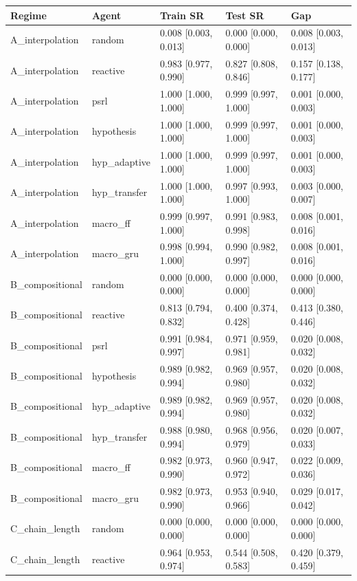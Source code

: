\begin{tabular}{lllll}
\toprule
Regime & Agent & Train SR & Test SR & Gap \\
\midrule
A\_interpolation & random & 0.008 [0.003, 0.013] & 0.000 [0.000, 0.000] & 0.008 [0.003, 0.013] \\
A\_interpolation & reactive & 0.983 [0.977, 0.990] & 0.827 [0.808, 0.846] & 0.157 [0.138, 0.177] \\
A\_interpolation & psrl & 1.000 [1.000, 1.000] & 0.999 [0.997, 1.000] & 0.001 [0.000, 0.003] \\
A\_interpolation & hypothesis & 1.000 [1.000, 1.000] & 0.999 [0.997, 1.000] & 0.001 [0.000, 0.003] \\
A\_interpolation & hyp\_adaptive & 1.000 [1.000, 1.000] & 0.999 [0.997, 1.000] & 0.001 [0.000, 0.003] \\
A\_interpolation & hyp\_transfer & 1.000 [1.000, 1.000] & 0.997 [0.993, 1.000] & 0.003 [0.000, 0.007] \\
A\_interpolation & macro\_ff & 0.999 [0.997, 1.000] & 0.991 [0.983, 0.998] & 0.008 [0.001, 0.016] \\
A\_interpolation & macro\_gru & 0.998 [0.994, 1.000] & 0.990 [0.982, 0.997] & 0.008 [0.001, 0.016] \\
B\_compositional & random & 0.000 [0.000, 0.000] & 0.000 [0.000, 0.000] & 0.000 [0.000, 0.000] \\
B\_compositional & reactive & 0.813 [0.794, 0.832] & 0.400 [0.374, 0.428] & 0.413 [0.380, 0.446] \\
B\_compositional & psrl & 0.991 [0.984, 0.997] & 0.971 [0.959, 0.981] & 0.020 [0.008, 0.032] \\
B\_compositional & hypothesis & 0.989 [0.982, 0.994] & 0.969 [0.957, 0.980] & 0.020 [0.008, 0.032] \\
B\_compositional & hyp\_adaptive & 0.989 [0.982, 0.994] & 0.969 [0.957, 0.980] & 0.020 [0.008, 0.032] \\
B\_compositional & hyp\_transfer & 0.988 [0.980, 0.994] & 0.968 [0.956, 0.979] & 0.020 [0.007, 0.033] \\
B\_compositional & macro\_ff & 0.982 [0.973, 0.990] & 0.960 [0.947, 0.972] & 0.022 [0.009, 0.036] \\
B\_compositional & macro\_gru & 0.982 [0.973, 0.990] & 0.953 [0.940, 0.966] & 0.029 [0.017, 0.042] \\
C\_chain\_length & random & 0.000 [0.000, 0.000] & 0.000 [0.000, 0.000] & 0.000 [0.000, 0.000] \\
C\_chain\_length & reactive & 0.964 [0.953, 0.974] & 0.544 [0.508, 0.583] & 0.420 [0.379, 0.459] \\

\end{tabular}
